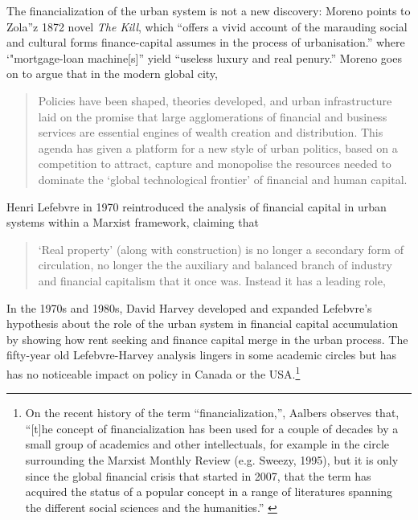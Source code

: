 {\color{red}
The financialization of the urban system is not a new discovery: Moreno \cite{morenoUrbanProcessFinancialised2014} points to Zola''z 1872 novel \textit{The Kill}, which ``offers a vivid account of the marauding social and cultural forms finance-capital assumes in the process of urbanisation.'' where ‘"mortgage-loan machine[s]'' yield ``useless luxury and real penury.'' Moreno goes on to argue that in the modern global city,
\begin{quotation}
    Policies have been shaped, theories developed, and urban infrastructure laid on the promise that large agglomerations of financial and business services are essential engines of wealth creation and distribution. This agenda has given a platform for a new style of urban politics, based on a competition to attract, capture and monopolise the resources needed to dominate the ‘global technological frontier’ of financial and human capital.
\end{quotation}


Henri Lefebvre in 1970 %
\cite{lefebvreRevolutionUrbaine1970, lefebvreUrbanRevolution2003} reintroduced the analysis of financial capital in urban systems within a Marxist framework, claiming that  
\begin{quotation}
     ‘Real property’ (along with construction) is no longer a secondary form of circulation, no longer the the auxiliary and balanced branch of industry and financial capitalism that it once was. Instead it has a leading role, 
\end{quotation}
In the 1970s and 1980s, David Harvey \cite{harveyClassmonopolyRentFinance1974} developed and expanded Lefebvre’s  hypothesis about the role of the urban system in financial capital accumulation by showing how rent seeking and finance capital merge in the urban process. The fifty-year old Lefebvre-Harvey analysis lingers in some academic circles but has has no noticeable impact on policy in Canada or the USA.\footnote{On the recent history of the term ``financialization,'', Aalbers observes that, ``[t]he concept of financialization has been used for a couple of decades by a small group of academics and other intellectuals, for example in the circle surrounding the Marxist Monthly Review (e.g. Sweezy, 1995), but it is only since the global financial crisis that started in 2007, that the term has acquired the status of a popular concept in a range of literatures spanning the different social sciences and the humanities.'' \cite{aalbersVariegatedFinancializationHousing2017}}  
} 


